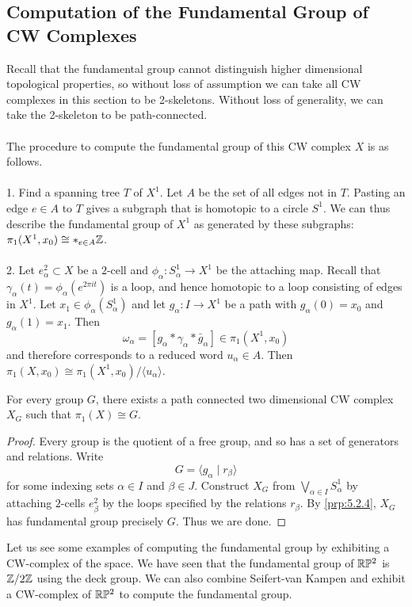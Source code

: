 \documentclass[a4paper]{article}
\begin{document}
\subsection{Computation of the Fundamental Group of CW Complexes}
Recall that the fundamental group cannot distinguish higher dimensional topological properties, so without loss of assumption we can take all CW complexes in this section to be 2-skeletons. Without loss of generality, we can take the 2-skeleton to be path-connected. \\~\\

The procedure to compute the fundamental group of this CW complex $X$ is as follows. \\~\\
1. Find a spanning tree $T$ of $X^1$. Let $A$ be the set of all edges not in $T$. Pasting an edge $e\in A$ to $T$ gives a subgraph that is homotopic to a circle $S^1$. We can thus describe the fundamental group of $X^1$ as generated by these subgraphs: $\pi_1(X^1,x_0)\cong\ast_{e\in A}\mathbb{Z}$. \\~\\
2. Let $e_\alpha^2\subset X$ be a $2$-cell and $\phi_\alpha:S_\alpha^1\to X^1$ be the attaching map. Recall that $\gamma_\alpha(t)=\phi_\alpha(e^{2\pi it})$ is a loop, and hence homotopic to a loop consisting of edges in $X^1$. Let $x_1\in\phi_\alpha(S_\alpha^1)$ and let $g_\alpha:I\to X^1$ be a path with $g_\alpha(0)=x_0$ and $g_\alpha(1)=x_1$. Then $$\omega_\alpha=[g_\alpha\ast\gamma_\alpha\ast\bar{g}_\alpha]\in\pi_1(X^1,x_0)$$ and therefore corresponds to a reduced word $u_\alpha\in A$. Then $\pi_1(X,x_0)\cong\pi_1(X^1,x_0)/\langle u_\alpha\rangle$. 

\begin{thm}{}{} For every group $G$, there exists a path connected two dimensional CW complex $X_G$ such that $\pi_1(X)\cong G$. \tcbline
\begin{proof}
Every group is the quotient of a free group, and so has a set of generators and relations. Write $$G=\langle g_\alpha\;|\;r_\beta\rangle$$ for some indexing sets $\alpha\in I$ and $\beta\in J$. Construct $X_G$ from $\bigvee_{\alpha\in I}S_\alpha^1$ by attaching $2$-cells $e_\beta^2$ by the loops specified by the relations $r_\beta$. By \ref{prp:5.2.4}, $X_G$ has fundamental group precisely $G$. Thus we are done. 
\end{proof}
\end{thm}

Let us see some examples of computing the fundamental group by exhibiting a CW-complex of the space. We have seen that the fundamental group of $\mathbb{R}\mathbb{P}^2$ is $\mathbb{Z}/2\mathbb{Z}$ using the deck group. We can also combine Seifert-van Kampen and exhibit a CW-complex of $\mathbb{R}\mathbb{P}^2$ to compute the fundamental group. 
\end{document}
